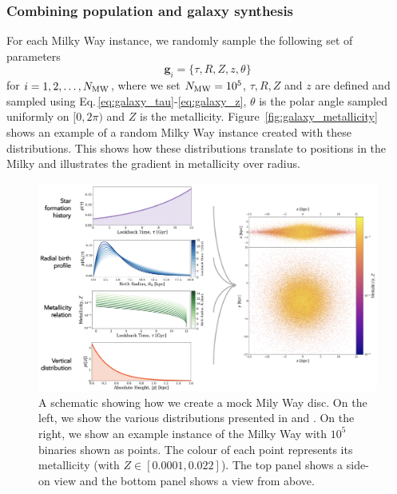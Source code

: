 \documentclass[twocolumn]{aastex63}
\begin{document}
\subsubsection{Combining population and galaxy synthesis}

For each Milky Way instance, we randomly sample the following set of parameters
\begin{equation}
    \mathbf{g}_{{i}} = \{\tau, R, Z, z, \theta\}
\end{equation}
for $i = 1, 2, \dots, N_{\rm MW}$, where we set $N_{\rm MW} = 10^{5}$, $\tau, R, Z$ and $z$ are defined and sampled using Eq.\,\ref{eq:galaxy_tau}-\ref{eq:galaxy_z}, $\theta$ is the polar angle sampled uniformly on $[0, 2\pi)$ and $Z$ is the metallicity. Figure~\ref{fig:galaxy_metallicity} shows an example of a random Milky Way instance created with these distributions. This shows how these distributions translate to positions in the Milky and illustrates the gradient in metallicity over radius.

\begin{figure}[t]
    \centering
    \includegraphics[width=\textwidth]{galaxy_diagram.png}
    \caption{A schematic showing how we create a mock Mily Way disc. On the left, we show the various distributions presented in \citet{Frankel+2018} and \citet{McMillan2011}. On the right, we show an example instance of the Milky Way with $10^5$ binaries shown as points. The colour of each point represents its metallicity (with $Z \in [0.0001, 0.022]$). The top panel shows a side-on view and the bottom panel shows a view from above.}
    \label{fig:galaxy_schematic}
\end{figure}

\end{document}
